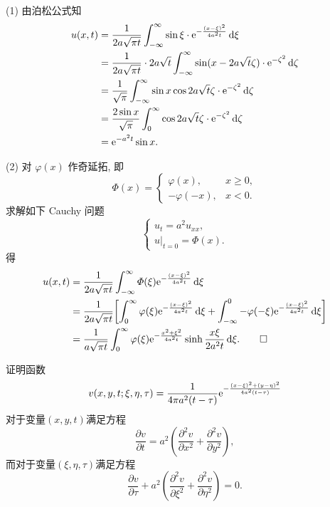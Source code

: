 \begin{solution}
  (1) 由泊松公式知
  \[\begin{split}
    u(x,t)
    & = \frac{1}{2a\sqrt{\pi t}} \int_{-\infty}^{\infty}
        \sin\xi\cdot \mathrm{e}^{-\frac{(x-\xi)^2}{4a^2t}}\mathop{}\!\mathrm{d}\xi \\
    & = \frac{1}{2a\sqrt{\pi t}}\cdot 2a\sqrt{t}\int_{-\infty}^{\infty}
        \sin(x-2a\sqrt{t}\zeta)\cdot \mathrm{e}^{-\zeta^2}\mathop{}\!\mathrm{d}\zeta \\
    & = \frac{1}{\sqrt{\pi}} \int_{-\infty}^{\infty}
        \sin x\cos 2a\sqrt{t}\zeta\cdot \mathrm{e}^{-\zeta^2}\mathop{}\!\mathrm{d}\zeta \\
    & = \frac{2\sin x}{\sqrt{\pi}} \int_0^{\infty}
        \cos 2a\sqrt{t}\zeta\cdot \mathrm{e}^{-\zeta^2}\mathop{}\!\mathrm{d}\zeta \\
    & = \mathrm{e}^{-a^2t}\sin x.
  \end{split}\]

  (2) 对 $\varphi(x)$ 作奇延拓, 即
  \[\varPhi(x) = \begin{cases}
    \varphi(x),   & x\geq 0, \\
    -\varphi(-x), & x<0.
  \end{cases}\]
  求解如下 Cauchy 问题
  \[\begin{cases}
    u_t = a^2 u_{xx}, \\
    u|_{t=0} = \varPhi(x).
  \end{cases}\]
  得
  \begin{align*}
    u(x,t)
    & = \frac{1}{2a\sqrt{\pi t}} \int_{-\infty}^{\infty}
        \varPhi(\xi) \mathrm{e}^{-\frac{(x-\xi)^2}{4a^2t}} \mathop{}\!\mathrm{d}\xi \\
    & = \frac{1}{2a\sqrt{\pi t}} \biggl[
        \int_0^{\infty} \varphi(\xi) \mathrm{e}^{-\frac{(x-\xi)^2}{4a^2t}} \mathop{}\!\mathrm{d}\xi
        + \int_{-\infty}^0 -\varphi(-\xi) \mathrm{e}^{-\frac{(x-\xi)^2}{4a^2t}}\mathop{}\!\mathrm{d}\xi\biggr] \\
    & = \frac{1}{a\sqrt{\pi t}} \int_0^{\infty} \varphi(\xi)
        \mathrm{e}^{-\frac{x^2+\xi^2}{4a^2 t}}\sinh \frac{x\xi}{2a^2 t}\mathop{}\!\mathrm{d}\xi. \qedhere
  \end{align*}
\end{solution}


\begin{exercise}
	证明函数
	$$v(x,y,t;\xi,\eta,\tau)=\frac{1}{4\pi a^2(t-\tau)}\mathrm{e}^{-\frac{(x-\xi)^2+(y-\eta)^2}{4a^2(t-\tau)}}$$
	对于变量$(x,y,t)$满足方程
	$$\dfrac{\partial v}{\partial t}=a^2\left(\dfrac{\partial^2v}{\partial x^2}+\dfrac{\partial^2v}{\partial y^2}\right),$$
	而对于变量$(\xi,\eta,\tau)$满足方程
	$$\frac{\partial v}{\partial\tau}+a^2\left(\frac{\partial^2v}{\partial\xi^2}+\frac{\partial^2v}{\partial\eta^2}\right)=0.$$
\end{exercise}

